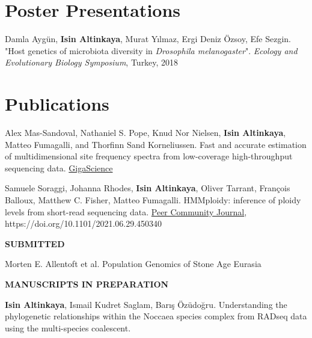 \documentclass[letterpaper,10.5pt]{article}
\begin{document}
\section{Poster Presentations}
Damla Aygün, \textbf{Isin Altinkaya}, Murat Y{\i}lmaz, Ergi Deniz \"{O}zsoy, Efe Sezgin. "Host genetics of microbiota diversity in \textit{Drosophila melanogaster}". \textit{Ecology and Evolutionary Biology Symposium}, Turkey, 2018 \\

\section{Publications}



Alex Mas-Sandoval, Nathaniel S. Pope, Knud Nor Nielsen, \textbf{Isin Altinkaya}, Matteo Fumagalli, and Thorfinn Sand Korneliussen. Fast and accurate estimation of multidimensional site frequency spectra from low-coverage high-throughput sequencing data. \href{https://doi.org/10.1093/gigascience/giac032}{GigaScience}  \\

\medskip


Samuele Soraggi, Johanna Rhodes, \textbf{Isin Altinkaya}, Oliver Tarrant, François Balloux, Matthew C. Fisher, Matteo Fumagalli. HMMploidy: inference of ploidy levels from short-read sequencing data. \href{https://doi.org/10.24072/pcjournal.178}{Peer Community Journal}, https://doi.org/10.1101/2021.06.29.450340 \\
\medskip

\textbf{SUBMITTED} \\
\medskip

Morten E. Allentoft et al. Population Genomics of Stone Age Eurasia \\

\medskip

\textbf{MANUSCRIPTS IN PREPARATION} \\
\medskip


\textbf{Isin Altinkaya}, Ismail Kudret Saglam, Bar{\i}\c{s} \"{O}z\"{u}do\u{g}ru. Understanding the phylogenetic relationships within the Noccaea species complex from RADseq data using the multi-species coalescent. \\
\end{document}
